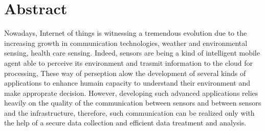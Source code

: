 \cleardoublepage
\chapter*{Abstract}%




Nowadays,
	Internet of things is witnessing a tremendous evolution due to the increasing growth in communication technologies,
	weather and environmental sensing, health care sensing.
Indeed,
	sensors are being a kind of intelligent mobile agent able to perceive its environment and trasmit information to the cloud for processing,
These way of perseption alow the development of several kinds of applications to enhance humain capacity to understand their environment and make approprate decision.
However,
	developing such advanced applications relies heavily on the quality of the communication between sensors and between sensors and the infrastructure,
	therefore,
	such communication can be realized only with the help of a secure data collection and efficient data treatment and analysis.

